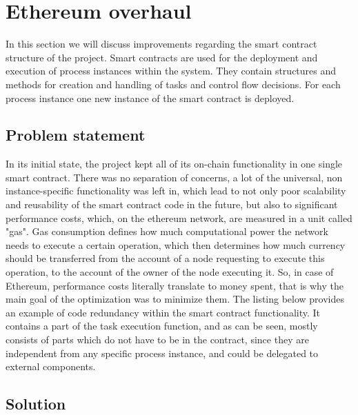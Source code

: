 %
\section{Ethereum overhaul}
\label{sec:impr:eth}

In this section we will discuss improvements regarding the smart contract structure of the project. Smart contracts are used for the deployment and execution of process instances within the system. They contain structures and methods for creation and handling of tasks and control flow decisions. For each process instance one new instance of the smart contract is deployed.

\subsection{Problem statement}
\label{sec:impr:eth:problem}

In its initial state, the project kept all of its on-chain functionality in one single smart contract. There was no separation of concerns, a lot of the universal, non instance-specific functionality was left in, which lead to not only poor scalability and reusability of the smart contract code in the future, but also to significant performance costs, which, on the ethereum network, are measured in a unit called "gas". Gas consumption defines how much computational power the network needs to execute a certain operation, which then determines how much currency should be transferred from the account of a node requesting to execute this operation, to the account of the owner of the node executing it. So, in case of Ethereum, performance costs literally translate to money spent, that is why the main goal of the optimization was to minimize them. The listing below provides an example of code redundancy within the smart contract functionality. It contains a part of the task execution function, and as can be seen, mostly consists of parts which do not have to be in the contract, since they are independent from any specific process instance, and could be delegated to external components.

 

\subsection{Solution}
\label{sec:impr:eth:solution}

